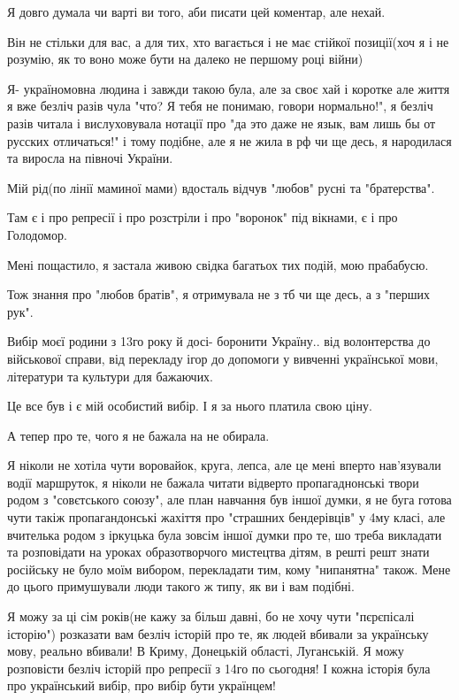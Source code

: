 \begin{itemize}


Я довго думала чи варті ви того, аби писати цей коментар, але нехай.

Він не стільки для вас, а для тих, хто вагається і не має стійкої позиції(хоч я
і не розумію, як то воно може бути на далеко не першому році війни)

Я- україномовна людина і завжди такою була, але за своє хай і коротке але життя
я вже безліч разів чула "что? Я тебя не понимаю, говори нормально!", я безліч
разів читала і вислуховувала нотації про "да это даже не язык, вам лишь бы от
русских отличаться!" і тому подібне, але я не жила в рф чи ще десь, я
народилася та виросла на півночі України.

Мій рід(по лінії маминої мами) вдосталь відчув "любов" русні та "братерства".

Там є і про репресії і про розстріли і про "воронок" під вікнами, є і про Голодомор.

Мені пощастило, я застала живою свідка багатьох тих подій, мою прабабусю.

Тож знання про "любов братів", я отримувала не з тб чи ще десь, а з "перших рук".

Вибір моєї родини з 13го року й досі- боронити Україну.. від волонтерства до
військової справи, від перекладу ігор до допомоги у вивченні української мови,
літератури та культури для бажаючих.

Це все був і є мій особистий вибір. І я за нього платила свою ціну.

А тепер про те, чого я не бажала на не обирала.

Я ніколи не хотіла чути воровайок, круга, лепса, але це мені вперто нав'язували
водії маршруток, я ніколи не бажала читати відверто пропагаднонські твори родом
з "совєтського союзу", але план навчання був іншої думки, я не буга готова чути
такіж пропагандонські жахіття про "страшних бендерівців" у 4му класі, але
вчителька родом з іркуцька була зовсім іншої думки про те, шо треба викладати
та розповідати на уроках образотворчого мистецтва дітям, в решті решт знати
російську не було моїм вибором, перекладати тим, кому "нипанятна" також. Мене
до цього примушували люди такого ж типу, як ви і вам подібні.

Я можу за ці сім років(не кажу за більш давні, бо не хочу чути "пєрєпісалі
історію") розказати вам безліч історій про те, як людей вбивали за українську
мову, реально вбивали! В Криму, Донецькій області, Луганській. Я можу
розповісти безліч історій про репресії з 14го по сьогодня! І кожна історія була
про український вибір, про вибір бути українцем!


\end{itemize}
